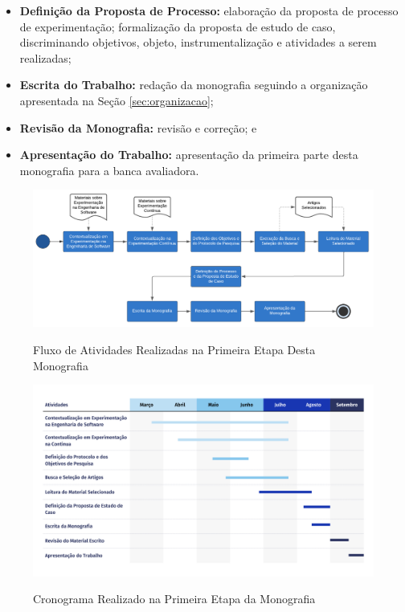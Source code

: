 \begin{itemize}
    \item \textbf{Definição da Proposta de Processo:} elaboração da proposta de processo de experimentação; formalização da proposta de estudo de caso, discriminando objetivos, objeto, instrumentalização e atividades a serem realizadas;
    \item \textbf{Escrita do Trabalho:} redação da monografia seguindo a organização apresentada na Seção \ref{sec:organizacao};
    \item \textbf{Revisão da Monografia:} revisão e correção; e
    \item \textbf{Apresentação do Trabalho:} apresentação da primeira parte desta monografia para a banca avaliadora.
\end{itemize}

\begin{figure}
    \caption{Fluxo de Atividades Realizadas na Primeira Etapa Desta Monografia}
    \centering
    \includegraphics[width=1\linewidth]{figuras/atividades1.png}
    \label{fig:atividades_1}
\end{figure}

\begin{figure}
    \caption{Cronograma Realizado na Primeira Etapa da Monografia}
    \centering
    \includegraphics[width=1\linewidth]{figuras/cronograma1.png}
    \label{fig:cronograma_1}
\end{figure}


